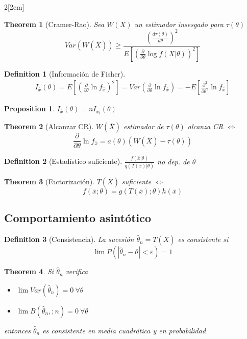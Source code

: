 \documentclass[leqno]{article}
\newtheorem*{theorem}{Theorem}
\newtheorem*{proposition}{Proposition}
\newtheorem*{definition}{Definition}
\begin{document}
\begin{multicols}{2}[\columnsep2em]
\begin{theorem}[Cramer-Rao] Sea $W(X)$ un estimador insesgado para $\tau (\theta )$
  \[
	Var(W(\overline{X}))\ge \frac{\left(\frac{d \tau (\theta )}{d \theta } \right)^2}{E\left[ \left( \frac{\partial}{\partial\theta } \log f(X|\theta ) \right)^2 \right]}
  \] 
\end{theorem}

\begin{definition}[Información de Fisher]
  \begin{align*}
  I_{\overline{x}}(\theta ) = E\left[ \left(  \frac{\partial}{\partial \theta } \ln f_{\overline{x}} \right) ^2 \right]  = Var\left(\frac{\partial}{\partial \theta }\ln f_{\overline{x}}\right) =  -E\left[  \frac{\partial^2}{\partial \theta ^2} \ln f_{\overline{x}} \right]
  \end{align*}
\end{definition}

\begin{proposition} $I_{\overline{x}}(\theta ) = nI_{x_i}(\theta )$
\end{proposition}

\begin{theorem}[Alcanzar CR] $W(\overline{X})$ estimador de $\tau (\theta )$ alcanza CR  $\iff$
\[
\frac{\partial}{\partial \theta } \ln f_{\overline{x}} = a(\theta )(W(\overline{X})-\tau (\theta ))
\] 
\end{theorem}

\begin{definition}[Estadístico suficiente] $\frac{f(\overline{x}|\theta )}{q(T(\overline{x})|\theta )}$ no dep. de $\theta $
\end{definition}

\begin{theorem}[Factorización] $T(\overline{X})$ suficiente $\iff$ 
\[
f(\overline{x}; \theta ) = g(T(\overline{x});\theta )h(\overline{x})
\] 
\end{theorem}

\subsection{Comportamiento asintótico}
\begin{definition}[Consistencia] La sucesión $\hat{\theta}_n = T(\overline{X})$ es consistente si 
\[
\lim P(|\hat{\theta }_n-\theta |<\varepsilon ) = 1
\] 
\end{definition}

\begin{theorem} Si $\hat{\theta }_n$ verifica
  \begin{itemize}[topsep=-6pt, itemsep=0pt]
    \item $\lim Var(\hat{\theta }_n) = 0 \ \forall \theta$
	\item $\lim B(\hat{\theta }_n,;n) = 0 \ \forall \theta $
  \end{itemize}
entonces $\hat{\theta}_n$ es consistente en media cuadrática y en probabilidad
\end{theorem}


\end{multicols}
\end{document}
